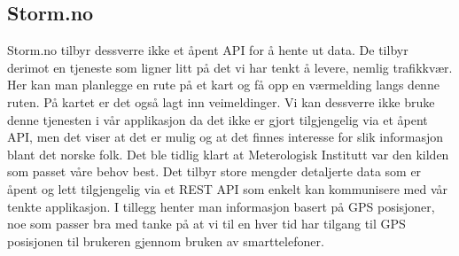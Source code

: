 \documentclass[a4paper,norsk,oneside]{book}
\begin{document}
\subsection{Storm.no}
Storm.no tilbyr dessverre ikke et åpent API for å hente ut data. De tilbyr derimot en tjeneste som ligner litt på det vi har tenkt å levere, nemlig trafikkvær. Her kan man planlegge en rute på et kart og få opp en værmelding langs denne ruten. På kartet er det også lagt inn veimeldinger. Vi kan dessverre ikke bruke denne tjenesten i vår applikasjon da det ikke er gjort tilgjengelig via et åpent API, men det viser at det er mulig og at det finnes interesse for slik informasjon blant det norske folk.
Det ble tidlig klart at Meterologisk Institutt var den kilden som passet våre behov best. Det tilbyr store mengder detaljerte data som er åpent og lett tilgjengelig via et REST API som enkelt kan kommunisere med vår tenkte applikasjon. I tillegg henter man informasjon basert på GPS posisjoner, noe som passer bra med tanke på at vi til en hver tid har tilgang til GPS posisjonen til brukeren gjennom bruken av smarttelefoner.\cite{storm}
\end{document}
